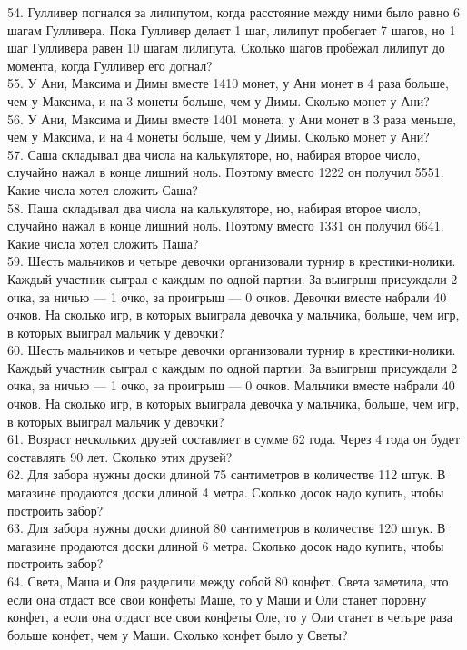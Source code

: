 \documentclass[12pt]{article}
\begin{document}
54. Гулливер погнался за лилипутом, когда расстояние между ними было равно 6 шагам Гулливера. Пока Гулливер делает 1 шаг, лилипут пробегает 7 шагов, но 1 шаг Гулливера равен 10 шагам лилипута. Сколько шагов пробежал лилипут до момента, когда Гулливер его догнал?\\
55. У Ани, Максима и Димы вместе 1410 монет, у Ани монет в 4 раза больше, чем у Максима, и на 3 монеты больше, чем у Димы. Сколько монет у Ани?\\
56. У Ани, Максима и Димы вместе 1401 монета, у Ани монет в 3 раза меньше, чем у Максима, и на 4 монеты больше, чем у Димы. Сколько монет у Ани?\\
57. Саша складывал два числа на калькуляторе, но, набирая второе число, случайно нажал в конце лишний ноль. Поэтому вместо 1222 он получил 5551. Какие числа хотел сложить Саша?\\
58. Паша складывал два числа на калькуляторе, но, набирая второе число, случайно нажал в конце лишний ноль. Поэтому вместо 1331 он получил 6641. Какие числа хотел сложить Паша?\\
59. Шесть мальчиков и четыре девочки организовали турнир в крестики-нолики. Каждый участник сыграл с каждым по одной партии. За выигрыш присуждали 2 очка, за ничью --- 1 очко, за проигрыш --- 0 очков. Девочки вместе набрали 40 очков. На сколько игр, в которых выиграла девочка у мальчика, больше, чем игр, в которых выиграл мальчик у девочки?\\
60. Шесть мальчиков и четыре девочки организовали турнир в крестики-нолики. Каждый участник сыграл с каждым по одной партии. За выигрыш присуждали 2 очка, за ничью --- 1 очко, за проигрыш --- 0 очков. Мальчики вместе набрали 40 очков. На сколько игр, в которых выиграла девочка у мальчика, больше, чем игр, в которых выиграл мальчик у девочки?\\
61. Возраст нескольких друзей составляет в сумме 62 года. Через 4 года он будет составлять 90 лет. Сколько этих друзей?\\
62. Для забора нужны доски длиной 75 сантиметров в количестве 112 штук. В магазине продаются доски длиной 4 метра. Сколько досок надо купить, чтобы построить забор?\\
63. Для забора нужны доски длиной 80 сантиметров в количестве 120 штук. В магазине продаются доски длиной 6 метра. Сколько досок надо купить, чтобы построить забор?\\
64. Света, Маша и Оля разделили между собой 80 конфет. Света заметила, что если она отдаст все свои конфеты Маше, то у Маши и Оли станет поровну конфет, а если она отдаст все свои конфеты Оле, то у Оли станет в четыре раза больше конфет, чем у Маши. Сколько конфет было у Светы?\\
\end{document}
